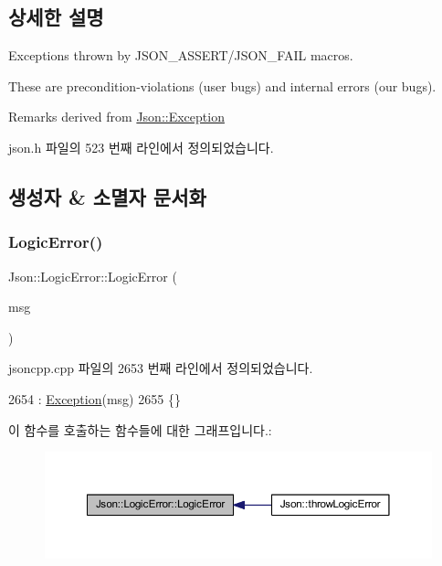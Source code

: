 \subsection{상세한 설명}
Exceptions thrown by J\+S\+O\+N\+\_\+\+A\+S\+S\+E\+R\+T/\+J\+S\+O\+N\+\_\+\+F\+A\+IL macros.

These are precondition-\/violations (user bugs) and internal errors (our bugs).

\begin{DoxyRemark}{Remarks}
derived from \hyperlink{class_json_1_1_exception}{Json\+::\+Exception} 
\end{DoxyRemark}


json.\+h 파일의 523 번째 라인에서 정의되었습니다.



\subsection{생성자 \& 소멸자 문서화}
\mbox{\label{class_json_1_1_logic_error_acca679aa49768a4a1de7b705c67c2919}} 
\subsubsection{\texorpdfstring{Logic\+Error()}{LogicError()}}
{\footnotesize\ttfamily Json\+::\+Logic\+Error\+::\+Logic\+Error (\begin{DoxyParamCaption}\item[{\hyperlink{json_8h_a1e723f95759de062585bc4a8fd3fa4be}{J\+S\+O\+N\+C\+P\+P\+\_\+\+S\+T\+R\+I\+NG} const \&}]{msg }\end{DoxyParamCaption})}



jsoncpp.\+cpp 파일의 2653 번째 라인에서 정의되었습니다.


\begin{DoxyCode}
2654   : \hyperlink{class_json_1_1_exception_ae764aa42e0755bd4ce9d303e2733fa8f}{Exception}(msg)
2655 \{\}
\end{DoxyCode}
이 함수를 호출하는 함수들에 대한 그래프입니다.\+:\nopagebreak
\begin{figure}[H]
\begin{center}
\leavevmode
\includegraphics[width=350pt]{class_json_1_1_logic_error_acca679aa49768a4a1de7b705c67c2919_icgraph}
\end{center}
\end{figure}


